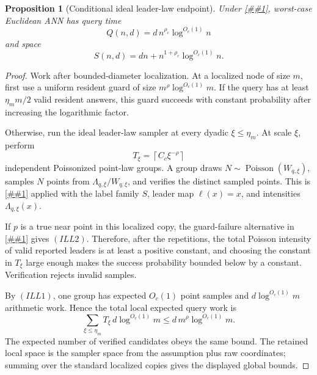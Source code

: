 \documentclass[10pt]{article}
\newcommand{\cref}[1]{\ref{##1}}
\newtheorem{proposition}[theorem]{Proposition}
\theoremstyle{definition}
\begin{document}
\begin{proposition}[Conditional ideal leader-law endpoint]
   \label{prop:ideal-leader-law-polylog}
   Under \cref{asm:ideal-likelihood-leader-law-sampler}, worst-case Euclidean
   ANN has query time
   \[
      Q(n,d)=d\,n^{\rho_c}\log^{O_c(1)}n
   \]
   and space
   \[
      S(n,d)=dn+n^{1+\rho_c}\log^{O_c(1)}n .
   \]
\end{proposition}

\begin{proof}
   Work after bounded-diameter localization.  At a localized node of size
   \(m\), first use a uniform resident guard of size
   \(m^\rho\log^{O_c(1)}m\).  If the query has at least
   \(\eta_m m/2\) valid resident answers, this guard succeeds with constant
   probability after increasing the logarithmic factor.

   Otherwise, run the ideal leader-law sampler at every dyadic
   \(\xi\le\eta_m\).  At scale \(\xi\), perform
   \[
      T_\xi=\left\lceil C_c\xi^{-\rho}\right\rceil
   \]
   independent Poissonized point-law groups.  A group draws
   \(N\sim\operatorname{Poisson}(W_{q,\xi})\), samples \(N\) points from
   \(\Lambda_{q,\xi}/W_{q,\xi}\), and verifies the distinct sampled points.
   This is \cref{lem:poissonized-normalized-leader-sampler} applied with the
   label family \(S\), leader map \(\ell(x)=x\), and intensities
   \(\Lambda_{q,\xi}(x)\).

   If \(p\) is a true near point in this localized copy, the guard-failure
   alternative in \cref{lem:ideal-likelihood-leader-law} gives
   \((ILL2)\).  Therefore, after the repetitions, the total Poisson intensity
   of valid reported leaders is at least a positive constant, and choosing the
   constant in \(T_\xi\) large enough makes the success probability bounded
   below by a constant.  Verification rejects invalid samples.

   By \((ILL1)\), one group has expected \(O_c(1)\) point samples and
   \(d\log^{O_c(1)}m\) arithmetic work.  Hence the total local expected query
   work is
   \[
      \sum_{\xi\le\eta_m}T_\xi\,d\log^{O_c(1)}m
      \le d\,m^\rho\log^{O_c(1)}m .
   \]
   The expected number of verified candidates obeys the same bound.  The
   retained local space is the sampler space from the assumption plus raw
   coordinates; summing over the standard localized copies gives the displayed
   global bounds.
\end{proof}
\end{document}
